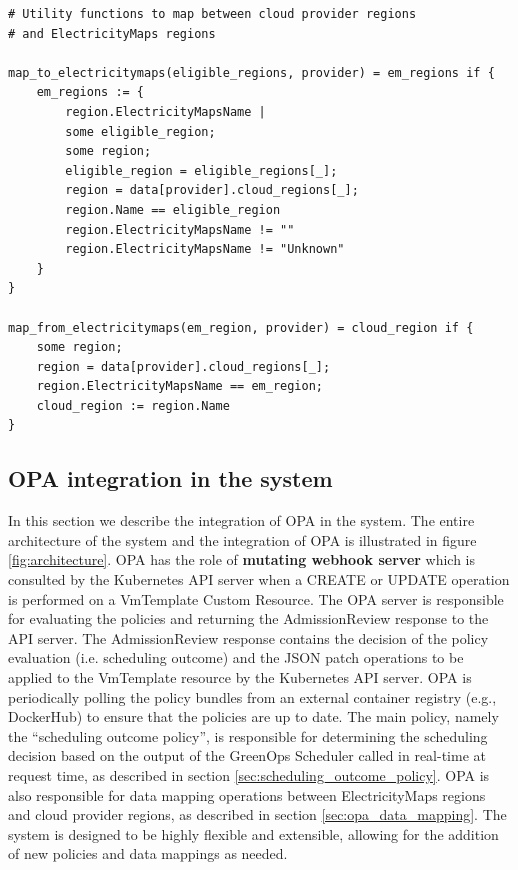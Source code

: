 \begin{lstlisting}[language=Rego, caption=Rego data mapping, label=lst:rego_data_mapping]
# Utility functions to map between cloud provider regions 
# and ElectricityMaps regions

map_to_electricitymaps(eligible_regions, provider) = em_regions if {
    em_regions := {
        region.ElectricityMapsName |                             
        some eligible_region;                       
        some region;                                
        eligible_region = eligible_regions[_];      
        region = data[provider].cloud_regions[_];   
        region.Name == eligible_region             
        region.ElectricityMapsName != ""            
        region.ElectricityMapsName != "Unknown"
    }
}

map_from_electricitymaps(em_region, provider) = cloud_region if {
    some region;                              
    region = data[provider].cloud_regions[_];   
    region.ElectricityMapsName == em_region;    
    cloud_region := region.Name 
}

\end{lstlisting}

\subsection{OPA integration in the system}

In this section we describe the integration of OPA in the system.
The entire architecture of the system and the integration of OPA is illustrated in figure \ref{fig:architecture}.
OPA has the role of \textbf{mutating webhook server} which is consulted by the Kubernetes API server when a CREATE or UPDATE operation is performed on a VmTemplate Custom Resource.
The OPA server is responsible for evaluating the policies and returning the AdmissionReview response to the API server.
The AdmissionReview response contains the decision of the policy evaluation (i.e. scheduling outcome) and the JSON patch operations to be applied to the VmTemplate resource by the Kubernetes API server.
OPA is periodically polling the policy bundles from an external container registry (e.g., DockerHub) to ensure that the policies are up to date.
The main policy, namely the ``scheduling outcome policy'', is responsible for determining the scheduling decision based on the output of the GreenOps Scheduler called in real-time at request time, as described in section \ref{sec:scheduling_outcome_policy}.
OPA is also responsible for data mapping operations between ElectricityMaps regions and cloud provider regions, as described in section \ref{sec:opa_data_mapping}.
The system is designed to be highly flexible and extensible, allowing for the addition of new policies and data mappings as needed.


